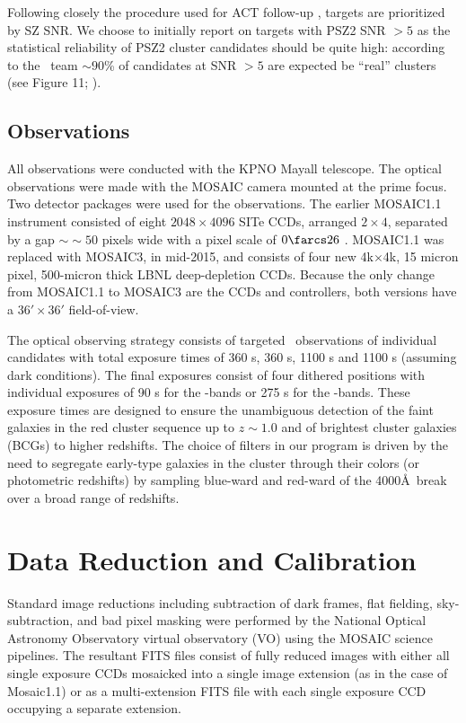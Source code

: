 \documentclass[apj, revtex4-1]{emulateapj}
\begin{document}

Following closely the procedure used for ACT follow-up , targets are prioritized by SZ SNR. We choose to initially report on targets with PSZ2 SNR $>5$ as the statistical reliability of PSZ2 cluster candidates should be quite high: according to the \planck\ team $\sim90$\% of candidates at SNR $>5$ are expected be ``real'' clusters (see Figure 11; \citealt{PlanckCollaboration2015a}).

\subsection{Observations}\label{sec: observations}
All observations were conducted with the KPNO Mayall telescope. The optical observations were made with the MOSAIC camera mounted at the prime focus. Two detector packages were used for the observations. The earlier MOSAIC1.1 instrument consisted of eight $2048\times4096$ SITe CCDs, arranged $2\times4$, separated by a gap $∼\sim50$ pixels wide with a pixel scale of $0\farcs26$ \perpixel. MOSAIC1.1 was replaced with MOSAIC3, in mid-2015, and consists of four new 4k$\times$4k, 15 micron pixel, 500-micron thick LBNL deep-depletion CCDs. Because the only change from MOSAIC1.1 to MOSAIC3 are the CCDs and controllers, both versions have a $36' \times 36'$ field-of-view.

The optical observing strategy consists of targeted \sdssg\sdssr\sdssi\sdssz\ observations of individual candidates with total exposure times of 360 s, 360 s, 1100 s and 1100 s (assuming dark conditions). The final exposures consist of four dithered positions with individual exposures of 90 s for the \sdssg\sdssr-bands or 275 s for the \sdssi\sdssz-bands. These exposure times are designed to ensure the unambiguous detection of the faint galaxies in the red cluster sequence up to $z \sim 1.0$ and of brightest cluster galaxies (BCGs) to higher redshifts. The choice of filters in our program is driven by the need to segregate early-type galaxies in the cluster through their colors (or photometric redshifts) by sampling blue-ward and red-ward of the 4000\AA\ break over a broad range of redshifts.

\section{Data Reduction and Calibration}\label{sec:data reduction}
Standard image reductions including subtraction of dark frames, flat fielding, sky-subtraction, and bad pixel masking were performed by the National Optical Astronomy Observatory virtual observatory (VO) using the MOSAIC \citep{Valdes2007} science pipelines. The resultant FITS files consist of fully reduced images with either all single exposure CCDs mosaicked into a single image extension (as in the case of Mosaic1.1) or as a multi-extension FITS file with each single exposure CCD occupying a separate extension.
\end{document}
